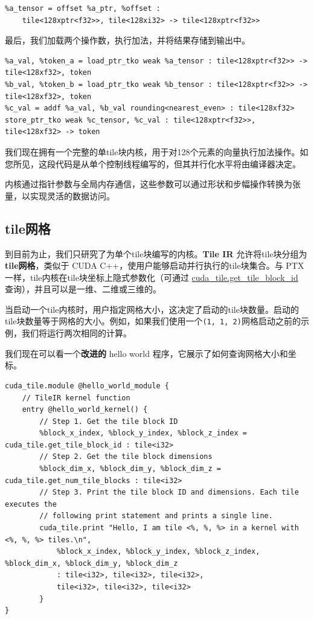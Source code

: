 \documentclass{article}
\begin{document}
\begin{lstlisting}
%a_tensor = offset %a_ptr, %offset :
    tile<128xptr<f32>>, tile<128xi32> -> tile<128xptr<f32>>
\end{lstlisting}

最后，我们加载两个操作数，执行加法，并将结果存储到输出中。


\begin{lstlisting}
%a_val, %token_a = load_ptr_tko weak %a_tensor : tile<128xptr<f32>> -> tile<128xf32>, token
%b_val, %token_b = load_ptr_tko weak %b_tensor : tile<128xptr<f32>> -> tile<128xf32>, token
%c_val = addf %a_val, %b_val rounding<nearest_even> : tile<128xf32>
store_ptr_tko weak %c_tensor, %c_val : tile<128xptr<f32>>, tile<128xf32> -> token
\end{lstlisting}

我们现在拥有一个完整的单tile块内核，用于对128个元素的向量执行加法操作。如您所见，这段代码是从单个控制线程编写的，但其并行化水平将由编译器决定。


内核通过指针参数与全局内存通信，这些参数可以通过形状和步幅操作转换为张量，以实现灵活的数据访问。



\subsection{tile网格}

到目前为止，我们只研究了为单个tile块编写的内核。\textbf{Tile IR} 允许将tile块分组为\textbf{tile网格}，类似于 CUDA C++，使用户能够启动并行执行的tile块集合。与 PTX 一样，tile内核在tile块坐标上隐式参数化（可通过 \href{https://docs.nvidia.com/cuda/tile-ir/latest/sections/operations.html#op-cuda-tile-get-tile-block-id}{cuda\_tile.get\_tile\_block\_id} 查询），并且可以是一维、二维或三维的。


当启动一个tile内核时，用户指定网格大小，这决定了启动的tile块数量。启动的tile块数量等于网格的大小。例如，如果我们使用一个\texttt{(1, 1, 2)}网格启动之前的示例，我们将运行两次相同的计算。


我们现在可以看一个\textbf{改进的} hello world 程序，它展示了如何查询网格大小和坐标。


\begin{lstlisting}
cuda_tile.module @hello_world_module {
    // TileIR kernel function
    entry @hello_world_kernel() {
        // Step 1. Get the tile block ID
        %block_x_index, %block_y_index, %block_z_index = cuda_tile.get_tile_block_id : tile<i32>
        // Step 2. Get the tile block dimensions
        %block_dim_x, %block_dim_y, %block_dim_z = cuda_tile.get_num_tile_blocks : tile<i32>
        // Step 3. Print the tile block ID and dimensions. Each tile executes the
        // following print statement and prints a single line.
        cuda_tile.print "Hello, I am tile <%, %, %> in a kernel with <%, %, %> tiles.\n",
            %block_x_index, %block_y_index, %block_z_index, %block_dim_x, %block_dim_y, %block_dim_z
            : tile<i32>, tile<i32>, tile<i32>,
            tile<i32>, tile<i32>, tile<i32>
        }
}
\end{lstlisting}
\end{document}
